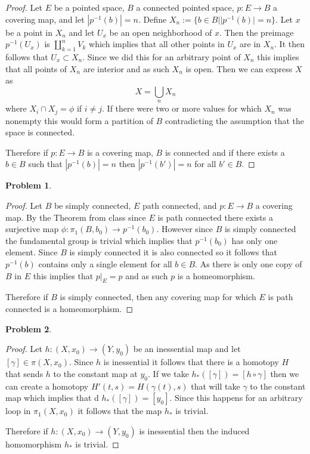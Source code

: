 \documentclass[10pt]{article}
\newcommand{\sk}{\vskip 10mm}
\theoremstyle{plain}
\newtheorem{problem}{Problem}
\theoremstyle{remark}
\begin{document}
\begin{proof}
  Let $E$ be a pointed space, $B$ a connected pointed space, $p:E\rightarrow B$ a covering map,
  and let $|p^{-1}(b)|=n$.
  Define $X_n:=\{b\in B||p^{-1}(b)|=n\}$. Let $x$ be a point in $X_n$ and let $U_x$ be
  an open neighborhood of $x$. Then the preimage $p^{-1}(U_x)$ is $\coprod_{k=1}^nV_k$
  which implies that all other points in $U_x$ are in $X_n$. It then follows that
  $U_x\subset X_n$. Since we did this for an arbitrary point of $X_n$ this implies that
  all points of $X_n$ are interior and as such $X_n$ is open. Then we can express
  $X$ as
  \[ X=\bigcup_nX_n\] where $X_i\cap X_j=\phi$ if $i\neq j$. If there were two or more values for
  which $X_n$ was nonempty this would form a partition of $B$ contradicting the assumption
  that the space is connected.

  Therefore if $p:E\rightarrow B$ is a covering map, $B$ is connected and if there exists
  a $b\in B$ such that $|p^{-1}(b)|=n$ then $|p^{-1}(b')|=n$ for all $b'\in B$.
\end{proof}

\sk

\begin{problem} %
  
\end{problem}

\begin{proof}
  Let $B$ be simply connected, $E$ path connected, and $p:E\rightarrow B$ a covering map.
  By the Theorem from class since $E$ is path connected there exists a
  surjective map $\phi:\pi_1(B,b_0)\rightarrow p^{-1}(b_0)$. However since $B$ is simply connected
  the fundamental group is trivial which implies that $p^{-1}(b_0)$ has only one
  element. Since $B$ is simply connected it is also connected so it follows that
  $p^{-1}(b)$ contains only a single element for all $b\in B$. As there is only one
  copy of $B$ in $E$ this implies that $p|_E=p$ and as such $p$ is a homeomorphism.

  Therefore if $B$ is simply connected, then any covering map for which $E$ is
  path connected is a homeomorphism.
\end{proof}

\sk

\begin{problem} %
  
\end{problem}

\begin{proof}
  Let $h:(X,x_0)\rightarrow (Y,y_0)$ be an inessential map and let $[\gamma]\in \pi(X,x_0)$.
  Since $h$ is inessential it follows that there is a homotopy $H$ that
  sends $h$ to the constant map at $y_0$. If we take $h_*([\gamma])=[h\circ\gamma]$
  then we can create a homotopy $H'(t,s)=H(\gamma(t),s)$ that will take $\gamma$
  to the constant map which implies that d $h_*([\gamma])=[y_0]$. Since
  this happens for an arbitrary loop in $\pi_1(X,x_0)$ it follows that
  the map $h_*$ is trivial.

  Therefore if $h:(X,x_0)\rightarrow (Y,y_0)$ is inessential then the induced homomorphism
  $h_*$ is trivial.
\end{proof}
  
\end{document}
